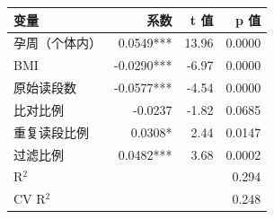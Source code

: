 \begin{tabular}{lrrr}
\toprule
变量 & 系数 & t 值 & p 值 \\
\midrule
孕周（个体内） & 0.0549*** & 13.96 & 0.0000 \\
BMI & -0.0290*** & -6.97 & 0.0000 \\
原始读段数 & -0.0577*** & -4.54 & 0.0000 \\
比对比例 & -0.0237 & -1.82 & 0.0685 \\
重复读段比例 & 0.0308* & 2.44 & 0.0147 \\
过滤比例 & 0.0482*** & 3.68 & 0.0002 \\
\midrule
R$^2$ & \multicolumn{3}{r}{0.294} \\
CV R$^2$ & \multicolumn{3}{r}{0.248} \\
\bottomrule
\end{tabular}
